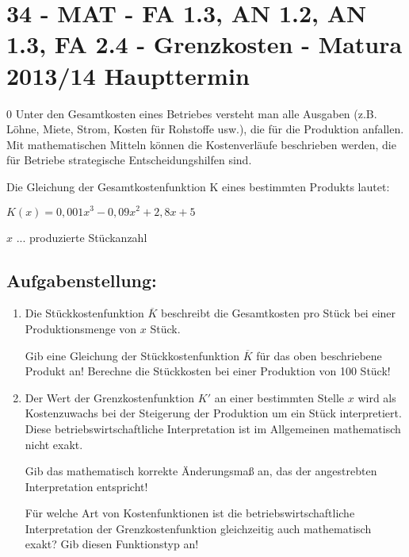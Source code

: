 \section{34 - MAT - FA 1.3, AN 1.2, AN 1.3, FA 2.4  - Grenzkosten - Matura 2013/14 Haupttermin}

\begin{langesbeispiel} \item[0] %
				Unter den Gesamtkosten eines Betriebes versteht man alle Ausgaben (z.B. Löhne, Miete, Strom, Kosten für Rohstoffe usw.), die für die Produktion anfallen. Mit mathematischen Mitteln können die Kostenverläufe beschrieben werden, die für Betriebe strategische Entscheidungshilfen sind.
				
Die Gleichung der Gesamtkostenfunktion K eines bestimmten Produkts lautet: 

$K(x)=0,001x^3-0,09x^2+2,8x+5$

$x$ ... produzierte Stückanzahl


\subsection{Aufgabenstellung:}
\begin{enumerate}
	\item  Die Stückkostenfunktion $\overline{K}$ beschreibt die Gesamtkosten pro Stück bei einer Produktionsmenge von $x$ Stück.
	
	 Gib eine Gleichung der Stückkostenfunktion $\overline{K}$ für das oben beschriebene Produkt an! Berechne die Stückkosten bei einer Produktion von 100 Stück!

 
\item  Der Wert der Grenzkostenfunktion $K'$ an einer bestimmten Stelle $x$ wird als Kostenzuwachs bei der Steigerung der Produktion um ein Stück interpretiert. Diese betriebswirtschaftliche Interpretation ist im Allgemeinen mathematisch nicht exakt. 

Gib das mathematisch korrekte Änderungsmaß an, das der angestrebten Interpretation entspricht! 

Für welche Art von Kostenfunktionen ist die betriebswirtschaftliche Interpretation der Grenzkostenfunktion gleichzeitig auch mathematisch exakt? Gib diesen Funktionstyp an!

						\end{enumerate}\leer
				
\end{langesbeispiel}

